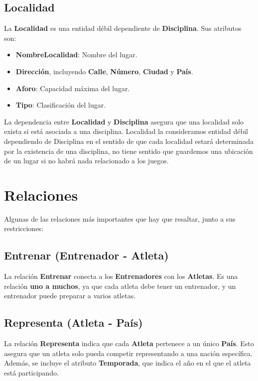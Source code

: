 \subsection*{Localidad}
La \textbf{Localidad} es una entidad débil dependiente de \textbf{Disciplina}. Sus atributos son:
\begin{itemize}
    \item \textbf{NombreLocalidad}: Nombre del lugar.
    \item \textbf{Dirección}, incluyendo \textbf{Calle}, \textbf{Número}, \textbf{Ciudad} y \textbf{País}.
    \item \textbf{Aforo}: Capacidad máxima del lugar.
    \item \textbf{Tipo}: Clasificación del lugar.
\end{itemize}
La dependencia entre \textbf{Localidad} y \textbf{Disciplina} asegura que una localidad solo exista si está asociada a una disciplina. Localidad la consideramos entidad débil dependiendo de Disciplina en el sentido de que cada localidad estará determinada por la existencia de una disciplina, no tiene sentido que guardemos una ubicación de un lugar si no habrá nada relacionado a los juegos.

\section*{Relaciones}

Algunas de las relaciones más importantes que hay que resaltar, junto a sus restricciones:

\subsection*{Entrenar (Entrenador - Atleta)}
La relación \textbf{Entrenar} conecta a los \textbf{Entrenadores} con los \textbf{Atletas}. Es una relación \textbf{uno a muchos}, ya que cada atleta debe tener un entrenador, y un entrenador puede preparar a varios atletas.

\subsection*{Representa (Atleta - País)}
La relación \textbf{Representa} indica que cada \textbf{Atleta} pertenece a un único \textbf{País}. Esto asegura que un atleta solo pueda competir representando a una nación específica. Además, se incluye el atributo \textbf{Temporada}, que indica el año en el que el atleta está participando.

